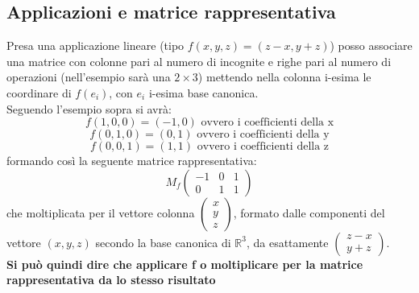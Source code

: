 \documentclass[a4paper,12pt, oneside]{book}
\begin{document}
\subsection{Applicazioni e matrice rappresentativa}
Presa una applicazione lineare (tipo $f(x,y,z)=(z-x,y+z)$) posso associare una matrice con colonne pari al numero di incognite e righe pari al numero di operazioni (nell'esempio sarà una $2\times 3$) mettendo nella colonna i-esima le coordinare di $f(e_i)$, con $e_i$ i-esima base canonica.\\ Seguendo l'esempio sopra si avrà:
$$f(1,0,0)=(-1,0) \mbox{ ovvero i coefficienti della x}$$
$$f(0,1,0)=(0,1) \mbox{ ovvero i coefficienti della y}$$
$$f(0,0,1)=(1,1) \mbox{ ovvero i coefficienti della z}$$
formando così la seguente matrice rappresentativa:
$$
	M_f\left(\begin{matrix}
			-1 & 0 & 1 \\
			0  & 1 & 1
		\end{matrix}\right)
$$
che moltiplicata per il vettore colonna $
	\left(\begin{matrix}
			x \\
			y \\
			z
		\end{matrix}\right)
$, formato dalle componenti del vettore $(x,y,z)$ secondo la base canonica di $\mathbb{R}^3$, da esattamente $\left(\begin{matrix}
			z-x \\
			y+z
		\end{matrix}\right)
$.\\ \textbf{Si può quindi dire che applicare f o moltiplicare per la matrice rappresentativa da lo stesso risultato}
\end{document}
